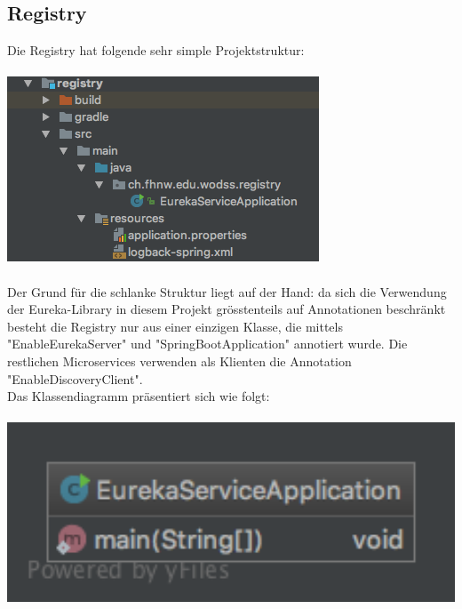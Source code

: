 \documentclass[11pt]{article} %
\begin{document}
\subsection{Registry}
Die Registry hat folgende sehr simple Projektstruktur:
\\
\\
\includegraphics[scale=0.7]{structure_registry}
\\
\\
Der Grund für die schlanke Struktur liegt auf der Hand: da sich die Verwendung der Eureka-Library in diesem Projekt grösstenteils auf Annotationen beschränkt besteht die Registry nur aus einer einzigen Klasse, die mittels "EnableEurekaServer" und "SpringBootApplication" annotiert wurde. Die restlichen Microservices verwenden als Klienten die Annotation "EnableDiscoveryClient".
\\
Das Klassendiagramm präsentiert sich wie folgt:
\\
\\
\includegraphics[width=1.0\textwidth]{class-diagrams/Registry-00}
\\
\\
\end{document}
